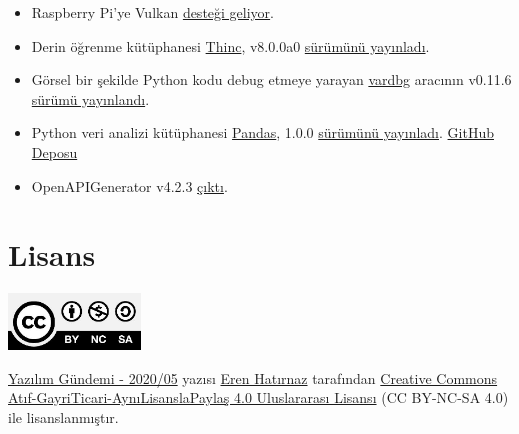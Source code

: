 \documentclass[11pt]{article}
\begin{document}
\begin{itemize}
\item Raspberry Pi'ye Vulkan \href{https://www.raspberrypi.org/blog/vulkan-raspberry-pi-first-triangle/}{desteği geliyor}.
\item Derin öğrenme kütüphanesi \href{https://github.com/explosion/thinc}{Thinc}, v8.0.0a0 \href{https://github.com/explosion/thinc/releases/tag/v8.0.0a0}{sürümünü yayınladı}.
\item Görsel bir şekilde Python kodu debug etmeye yarayan \href{https://github.com/CCExtractor/vardbg}{vardbg} aracının v0.11.6
\href{https://github.com/CCExtractor/vardbg/releases/tag/v0.11.6}{sürümü yayınlandı}.
\item Python veri analizi kütüphanesi \href{https://pandas.pydata.org/pandas-docs/stable/index.html}{Pandas}, 1.0.0 \href{https://pandas.pydata.org/pandas-docs/stable/whatsnew/v1.0.0.html}{sürümünü yayınladı}. \href{https://github.com/pandas-dev/pandas}{GitHub
Deposu}
\item OpenAPIGenerator v4.2.3 \href{https://github.com/OpenAPITools/openapi-generator/releases/tag/v4.2.3}{çıktı}.
\end{itemize}
\section{Lisans}
\label{sec:org4805d84}
\begin{center}
\begin{center}
\includegraphics[height=1.5cm]{../../../img/CC_BY-NC-SA_4.0.png}
\end{center}

\href{yazilim-gundemi-2020-05.pdf}{Yazılım Gündemi - 2020/05} yazısı \href{https://erenhatirnaz.github.io}{Eren Hatırnaz} tarafından \href{http://creativecommons.org/licenses/by-nc-sa/4.0/}{Creative Commons
Atıf-GayriTicari-AynıLisanslaPaylaş 4.0 Uluslararası Lisansı} (CC BY-NC-SA 4.0)
ile lisanslanmıştır.
\end{center}
\end{document}
